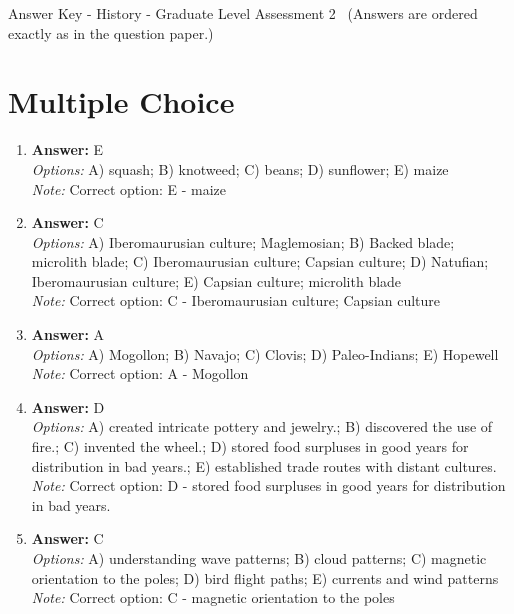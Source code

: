 \documentclass[12pt]{article}
\begin{document}
\begin{center}
Answer Key - History - Graduate Level Assessment 2 \
\small (Answers are ordered exactly as in the question paper.)
\end{center}

\section*{Multiple Choice}
\begin{enumerate}[label=\arabic*.]
\item \textbf{Answer:} E
\\ \textit{Options:} A) squash; B) knotweed; C) beans; D) sunflower; E) maize
\\ \textit{Note:} Correct option: E - maize
\item \textbf{Answer:} C
\\ \textit{Options:} A) Iberomaurusian culture; Maglemosian; B) Backed blade; microlith blade; C) Iberomaurusian culture; Capsian culture; D) Natufian; Iberomaurusian culture; E) Capsian culture; microlith blade
\\ \textit{Note:} Correct option: C - Iberomaurusian culture; Capsian culture
\item \textbf{Answer:} A
\\ \textit{Options:} A) Mogollon; B) Navajo; C) Clovis; D) Paleo-Indians; E) Hopewell
\\ \textit{Note:} Correct option: A - Mogollon
\item \textbf{Answer:} D
\\ \textit{Options:} A) created intricate pottery and jewelry.; B) discovered the use of fire.; C) invented the wheel.; D) stored food surpluses in good years for distribution in bad years.; E) established trade routes with distant cultures.
\\ \textit{Note:} Correct option: D - stored food surpluses in good years for distribution in bad years.
\item \textbf{Answer:} C
\\ \textit{Options:} A) understanding wave patterns; B) cloud patterns; C) magnetic orientation to the poles; D) bird flight paths; E) currents and wind patterns
\\ \textit{Note:} Correct option: C - magnetic orientation to the poles
\end{enumerate}
\end{document}
